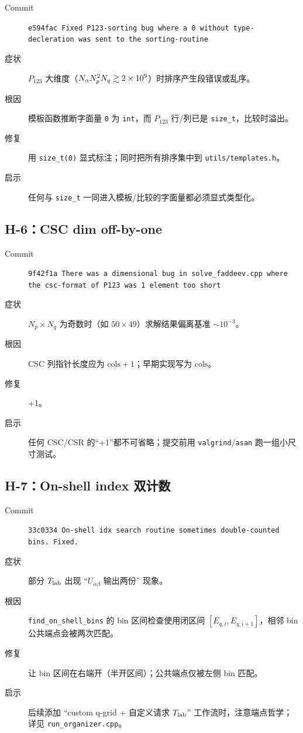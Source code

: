 \begin{description}
  \item[Commit] \texttt{e594fac Fixed P123-sorting bug where a 0 without type-decleration was sent to the sorting-routine}
  \item[症状] \(P_{123}\) 大维度（\(N_\alpha N_p^2 N_q\gtrsim 2\times 10^9\)）时排序产生段错误或乱序。
  \item[根因] 模板函数推断字面量 \texttt{0} 为 \texttt{int}，而 \(P_{123}\) 行/列已是 \texttt{size\_t}，比较时溢出。
  \item[修复] 用 \texttt{size\_t(0)} 显式标注；同时把所有排序集中到 \texttt{utils/templates.h}。
  \item[启示] 任何与 \texttt{size\_t} 一同进入模板/比较的字面量都必须显式类型化。
\end{description}

\subsection{H-6：CSC dim off-by-one}

\begin{description}
  \item[Commit] \texttt{9f42f1a There was a dimensional bug in solve\_faddeev.cpp where the csc-format of P123 was 1 element too short}
  \item[症状] \(N_p\times N_q\) 为奇数时（如 \(50\times 49\)）求解结果偏离基准 \(\sim 10^{-3}\)。
  \item[根因] CSC 列指针长度应为 \(\text{cols}+1\)；早期实现写为 \(\text{cols}\)。
  \item[修复] +1。
  \item[启示] 任何 CSC/CSR 的“+1”都不可省略；提交前用 \texttt{valgrind}/\texttt{asan} 跑一组小尺寸测试。
\end{description}

\subsection{H-7：On-shell index 双计数}

\begin{description}
  \item[Commit] \texttt{33c0334 On-shell idx search routine sometimes double-counted bins. Fixed.}
  \item[症状] 部分 \({T_{\text{lab}}}\) 出现 “\(U_{αβ}\) 输出两份” 现象。
  \item[根因] \texttt{find\_on\_shell\_bins} 的 bin 区间检查使用闭区间 \([E_{q,i},E_{q,i+1}]\)，相邻 bin 公共端点会被两次匹配。
  \item[修复] 让 bin 区间在右端开（半开区间）；公共端点仅被左侧 bin 匹配。
  \item[启示] 后续添加 “custom q-grid + 自定义请求 \({T_{\text{lab}}}\)” 工作流时，注意端点哲学；详见 \texttt{run\_organizer.cpp}。
\end{description}

